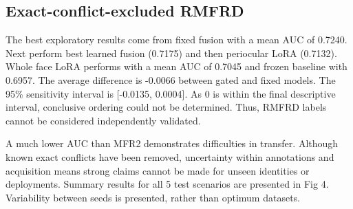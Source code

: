 \documentclass[10pt,lettersize,journal]{IEEEtran}
\begin{document}
\subsection{Exact-conflict-excluded RMFRD}
The best exploratory results come from fixed fusion with a mean AUC of 0.7240. Next perform best learned fusion (0.7175) and then periocular LoRA (0.7132). Whole face LoRA performs with a mean AUC of 0.7045 and frozen baseline with 0.6957. The average difference is -0.0066 between gated and fixed models. The 95\% sensitivity interval is [-0.0135, 0.0004]. As 0 is within the final descriptive interval, conclusive ordering could not be determined. Thus, RMFRD labels cannot be considered independently validated.\par
A much lower AUC than MFR2 demonstrates difficulties in transfer. Although known exact conflicts have been removed, uncertainty within annotations and acquisition means strong claims cannot be made for unseen identities or deployments. Summary results for all 5 test scenarios are presented in Fig 4. Variability between seeds is presented, rather than optimum datasets.\par
\end{document}
